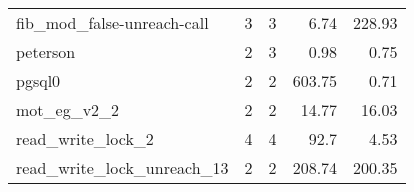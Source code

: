\begin{tabular}{l|r|r|r|r}
  {\color[HTML]{000000} fib\_mod\_false-unreach-call} & {\color[HTML]{656565} 3}                                                                                         & {\color[HTML]{000000} 3}                                                                 & {\color[HTML]{656565} 6.74}                                                                                 & {\color[HTML]{000000} 228.93}                                                      \\
  peterson                                            & {\color[HTML]{656565} 2}                                                                                         & 3                                                                                        & {\color[HTML]{656565} 0.98}                                                                                 & 0.75                                                                               \\
  {\color[HTML]{000000} pgsql0}                       & {\color[HTML]{656565} 2}                                                                                         & {\color[HTML]{000000} 2}                                                                 & {\color[HTML]{656565} 603.75}                                                                               & {\color[HTML]{000000} 0.71}                                                        \\
  mot\_eg\_v2\_2                                      & {\color[HTML]{656565} 2}                                                                                         & 2                                                                                        & {\color[HTML]{656565} 14.77}                                                                                & 16.03                                                                              \\
  {\color[HTML]{000000} read\_write\_lock\_2}         & {\color[HTML]{656565} 4}                                                                                         & {\color[HTML]{000000} 4}                                                                 & {\color[HTML]{656565} 92.7}                                                                                 & {\color[HTML]{000000} 4.53}                                                        \\
  read\_write\_lock\_unreach\_13                      & {\color[HTML]{656565} 2}                                                                                         & 2                                                                                        & {\color[HTML]{656565} 208.74}                                                                               & 200.35                                                                            
  \end{tabular}